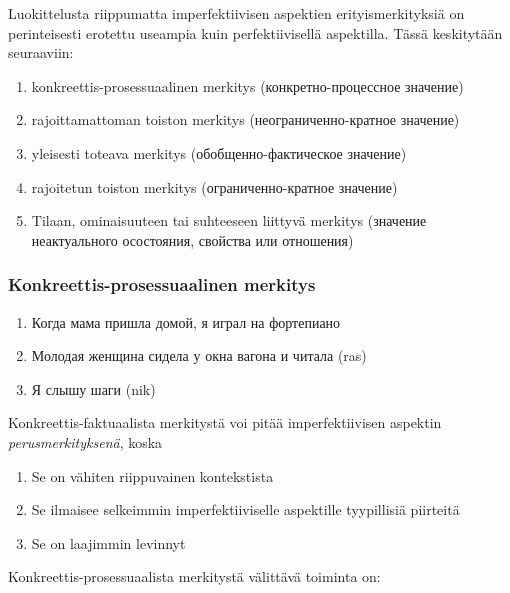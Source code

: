 \documentclass[finnish,russian,]{article}
\begin{document}
Luokittelusta riippumatta imperfektiivisen aspektien erityismerkityksiä
on perinteisesti erotettu useampia kuin perfektiivisellä aspektilla.
Tässä keskitytään seuraaviin:

\begin{enumerate}
\def\labelenumi{\arabic{enumi}.}
\itemsep1pt\parskip0pt
\item
  konkreettis-prosessuaalinen merkitys (конкретно-процессное значение)
\item
  rajoittamattoman toiston merkitys (неограниченно-кратное значение)
\item
  yleisesti toteava merkitys (обобщенно-фактическое значение)
\item
  rajoitetun toiston merkitys (ограниченно-кратное значение)
\item
  Tilaan, ominaisuuteen tai suhteeseen liittyvä merkitys (значение
  неактуального осостояния, свойства или отношения)
\end{enumerate}

\subsubsection{Konkreettis-prosessuaalinen
merkitys}\label{konkreettis-prosessuaalinen-merkitys}

\begin{enumerate}
\def\labelenumi{(\arabic{enumi})}
\setcounter{enumi}{7}
\itemsep1pt\parskip0pt
\item
  Когда мама пришла домой, я играл на фортепиано
\item
  Молодая женщина сидела у окна вагона и читала (ras)
\item
  Я слышу шаги (nik)
\end{enumerate}

Konkreettis-faktuaalista merkitystä voi pitää imperfektiivisen aspektin
\emph{perusmerkityksenä}, koska

\begin{enumerate}
\def\labelenumi{\alph{enumi}.}
\itemsep1pt\parskip0pt
\item
  Se on vähiten riippuvainen kontekstista
\item
  Se ilmaisee selkeimmin imperfektiiviselle aspektille tyypillisiä
  piirteitä
\item
  Se on laajimmin levinnyt
\end{enumerate}

Konkreettis-prosessuaalista merkitystä välittävä toiminta on:
\end{document}
